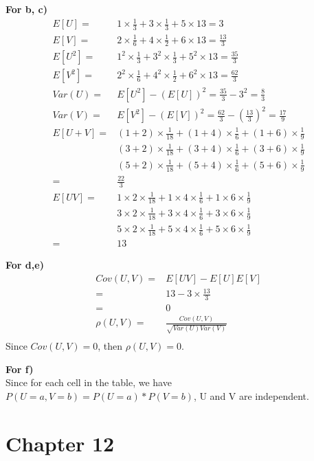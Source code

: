 \documentclass[11pt]{article} %
\begin{document}
{\bf For b, c)} \\
\begin{align*}
E[U] = & 1\times \frac{1}{3} + 3\times \frac{1}{3} + 5\times{1}{3} = 3 \\
E[V] = & 2\times \frac{1}{6} + 4\times \frac{1}{2} + 6\times{1}{3} = \frac{13}{3} \\
E[U^2] = & 1^2\times \frac{1}{3} + 3^2\times \frac{1}{3} + 5^2\times{1}{3} = \frac{35}{3}  \\
E[V^2] = & 2^2\times \frac{1}{6} + 4^2\times \frac{1}{2} + 6^2\times{1}{3} = \frac{62}{3} \\
Var(U) = & E[U^2] - (E[U])^2 = \frac{35}{3} - 3^2 = \frac{8}{3} \\
Var(V) = & E[V^2] - (E[V])^2 = \frac{62}{3}- \left(\frac{13}{3}\right)^2 = \frac{17}{9}\\
E[U + V] = & (1+2) \times \frac{1}{18} + (1 + 4) \times \frac{1}{6} + (1+ 6) \times \frac{1}{9} \\
& (3+2) \times \frac{1}{18} + (3+4) \times \frac{1}{6} + (3+6) \times \frac{1}{9}  \\
& (5+2) \times \frac{1}{18} + (5+4) \times \frac{1}{6} + (5+6) \times \frac{1}{9}  \\
= & \frac{22}{3} \\
E[UV] = & 1\times 2 \times \frac{1}{18} + 1\times 4 \times \frac{1}{6} + 1\times 6 \times \frac{1}{9} \\
& 3\times 2 \times \frac{1}{18} + 3\times 4 \times \frac{1}{6} + 3\times 6 \times \frac{1}{9}  \\
& 5\times 2 \times \frac{1}{18} + 5\times 4 \times \frac{1}{6} + 5 \times 6 \times \frac{1}{9}  \\
= & 13 
\end{align*}


{\bf For d,e)} \\
\begin{align*}
Cov(U, V) = & E[UV] - E[U]E[V] \\
= & 13 - 3\times \frac{13}{3} \\
= & 0 \\
\rho(U, V) = & \frac{Cov(U, V)}{\sqrt{Var(U)Var(V)}}\\
\end{align*}
Since $Cov(U, V) = 0$, then $\rho(U, V) = 0$.

{\bf For f)} \\
Since for each cell in the table, we have $P(U = a, V = b) = P(U = a) * P(V = b)$, U and V are independent.
\section{Chapter 12}
\end{document}

